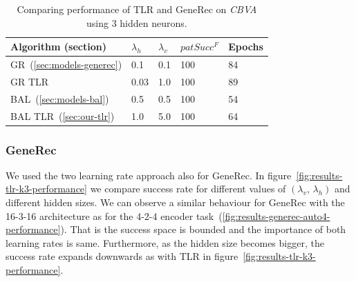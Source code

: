 \begin{table}[H] 
  \centering
    \begin{tabular}{|l|l|l|l|l|}
    \hline
    Algorithm (section)&$\lambda_h$&$\lambda_v$&$patSucc^F$ &Epochs\\ %
    \hline
    GR~(\ref{sec:models-generec}) & 0.1 & 0.1 & 100 & 84\\ %
    \hline
    GR TLR &0.03 & 1.0 & 100 & 89\\ %
    \hline
    BAL~(\ref{sec:models-bal})&0.5& 0.5&100& 54\\ %
    \hline
    BAL TLR~(\ref{sec:our-tlr})&1.0& 5.0 & 100& 64\\ %
    \hline 
    \end{tabular}
  \caption{Comparing performance of TLR and GeneRec on \emph{CBVA} using 3 hidden neurons.} 
  \label{tab:results-cmp-k3}
\end{table}






\subsubsection{GeneRec} 

We used the two learning rate approach also for GeneRec. In figure~\ref{fig:results-tlr-k3-performance} we compare success rate for different values of $(\lambda_v,\, \lambda_h)$ and different hidden sizes. We can observe a similar behaviour for GeneRec with the 16-3-16 architecture as for the 4-2-4 encoder task~(\ref{fig:results-generec-auto4-performance}). That is the success space is bounded and the importance of both learning rates is same. Furthermore, as the hidden size becomes bigger, the success rate expands downwards as with TLR in figure~\ref{fig:results-tlr-k3-performance}. 

